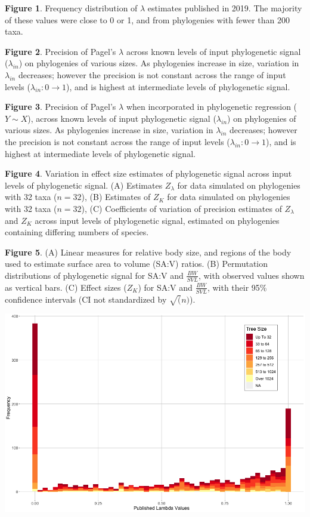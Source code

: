 \documentclass[
]{article}
\begin{document}
\textbf{Figure 1}. Frequency distribution of \(\lambda\) estimates
published in 2019. The majority of these values were close to 0 or 1,
and from phylogenies with fewer than 200 taxa. \hfill\break

\textbf{Figure 2}. Precision of Pagel's \(\lambda\) across known levels
of input phylogenetic signal (\(\lambda_{in}\)) on phylogenies of
various sizes. As phylogenies increase in size, variation in
\(\lambda_{in}\) decreases; however the precision is not constant across
the range of input levels (\(\lambda_{in}: 0 \to 1\)), and is highest at
intermediate levels of phylogenetic signal. \hfill\break

\textbf{Figure 3}. Precision of Pagel's \(\lambda\) when incorporated in
phylogenetic regression (\(Y\sim X\)), across known levels of input
phylogenetic signal (\(\lambda_{in}\)) on phylogenies of various sizes.
As phylogenies increase in size, variation in \(\lambda_{in}\)
decreases; however the precision is not constant across the range of
input levels (\(\lambda_{in}: 0 \to 1\)), and is highest at intermediate
levels of phylogenetic signal. \hfill\break

\textbf{Figure 4}. Variation in effect size estimates of phylogenetic
signal across input levels of phylogenetic signal. (A) Estimates
\(Z_\lambda\) for data simulated on phylogenies with 32 taxa (\(n=32\)),
(B) Estimates of \(Z_K\) for data simulated on phylogenies with 32 taxa
(\(n=32\)), (C) Coefficients of variation of precision estimates of
\(Z_\lambda\) and \(Z_K\) across input levels of phylogenetic signal,
estimated on phylogenies containing differing numbers of species.

\textbf{Figure 5}. (A) Linear measures for relative body size, and
regions of the body used to estimate surface area to volume (SA:V)
ratios. (B) Permutation distributions of phylogenetic signal for SA:V
and \(\frac{BW}{SVL}\), with observed values shown as vertical bars. (C)
Effect sizes (\(Z_K\)) for SA:V and \(\frac{BW}{SVL}\), with their 95\%
confidence intervals (CI not standardized by \(\sqrt(n)\)).

\newpage

\includegraphics[width=0.95\linewidth]{Fig1}
\end{document}
